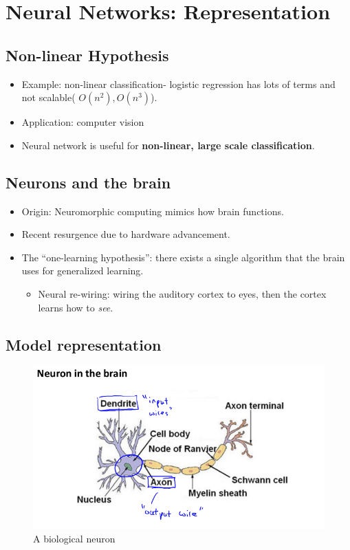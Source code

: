 \section{Neural Networks: Representation}

    \subsection{Non-linear Hypothesis}
        \begin{itemize}
            \item Example: non-linear classification- logistic regression has lots of terms and not scalable( $O(n^2), O(n^3)$).
            \item Application: computer vision
            \item Neural network is useful for \textbf{non-linear, large scale classification}.
        \end{itemize}
    
    \subsection{Neurons and the brain}
        \begin{itemize}
            \item Origin: Neuromorphic computing mimics how brain functions.
            \item Recent resurgence due to hardware advancement.
            \item The ``one-learning hypothesis'': there exists a single algorithm that the brain uses for generalized learning. 
                \begin{itemize}
                    \item Neural re-wiring: wiring the auditory cortex to eyes, then the cortex learns how to \emph{see}.
                \end{itemize}
        \end{itemize} 


    \subsection{Model representation}
        \begin{figure}[htbp]
            \centering
            \includegraphics[width=\textwidth]{image/neuron.png}
            \caption{A biological neuron}
            \label{fig:neuron}
        \end{figure}

